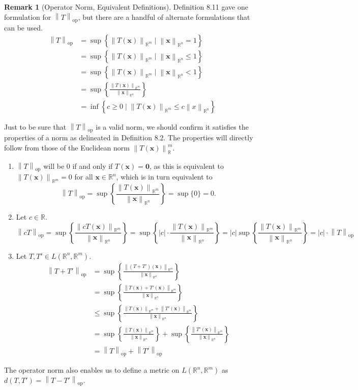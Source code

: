 \documentclass{article}
\newcommand{\R}{\mathbb{R}}
\newcommand{\x}{\mathbf{x}}
\newcommand{\ze}{\mathbf{0}}
\newcommand{\norm}[1]{\left\lVert#1\right\rVert}
\newcommand{\normop}[1]{\left\lVert#1\right\rVert_\text{op}}
\theoremstyle{definition}
\newtheorem{remark}{Remark}[section]
\begin{document}
	\begin{remark}[Operator Norm, Equivalent Definitions]
		Definition 8.11 gave one formulation for $ \norm{T}_\text{op} $, but there are a handful of alternate formulations that can be used. 
		\begin{align*}
			\norm{T}_\text{op} &  = \sup\left\{\norm{T(\x)}_{\R^m}\mid \norm{\x}_{\R^n} = 1\right\} \\
			&  =  \sup\left\{\norm{T(\x)}_{\R^m}\mid \norm{\x}_{\R^n} \le 1\right\} \\
			&  =  \sup\left\{\norm{T(\x)}_{\R^m}\mid \norm{\x}_{\R^n} < 1\right\} \\ 
			&  =  \sup\left\{\frac{\norm{T(\x)}_{\R^m}}{\norm{\x}_{\R^n}}\right\} \\
			& =\inf\left\{c\ge 0\mid \norm{T(\x)}_{\R^m} \le c\norm{x}_{\R^n}\right\}
		\end{align*}
	\end{remark}
	
	Just to be sure that $ \normop{T} $ is a valid norm, we should confirm it satisfies the properties of a norm as delineated in Definition 8.2. The properties will directly follow from those of the Euclidean norm $ \norm{T(\x)}_\R^m $. 
	\begin{enumerate}
		\item $ \normop{T} $ will be $ 0 $ if and only if $ T(\x)=\ze $, as this is equivalent to $ \norm{T(\x)}_{\R^m} = 0 $ for all $ \x\in\R^n $, which is in turn equivalent to  
		$$ \normop{T} = \sup\left\{\frac{\norm{T(\x)}_{\R^m}}{\norm{\x}_{\R^n}}\right\} = \sup\{0\} = 0.$$
		\item Let $ c\in \R $. 
		$$ \normop{cT} =\sup\left\{\frac{\norm{cT(\x)}_{\R^m}}{\norm{\x}_{\R^n}}\right\} = \sup \left\{|c|\cdot\frac{\norm{T(\x)}_{\R^m}}{\norm{\x}_{\R^n}}\right\} = |c| \sup\left\{\frac{\norm{T(\x)}_{\R^m}}{\norm{\x}_{\R^n}}\right\} =  |c|\cdot \normop{T}$$
		\item Let $ T,T'\in L(\R^n,\R^m) $.
		\begin{align*}
			\normop{T + T'} &= \sup\left\{\frac{\norm{(T + T')(\x)}_{\R^m}}{\norm{\x}_{\R^n}}\right\} \\
			& =  \sup\left\{\frac{\norm{T(\x) + T'(\x)}_{\R^m}}{\norm{\x}_{\R^n}}\right\} \\ 
			& \le  \sup\left\{\frac{\norm{T(\x)}_{\R^m} + \norm{T'(\x)}_{\R^m} }{\norm{\x}_{\R^n}}\right\} \\ 
			& =\sup\left\{\frac{\norm{T(\x)}_{\R^m}}{\norm{\x}_{\R^n}}\right\}  +  \sup\left\{\frac{\norm{T'(\x)}_{\R^m}}{\norm{\x}_{\R^n}}\right\} \\ 
			& = \normop{T }+ \normop{T'}
		\end{align*}
	\end{enumerate}
	The operator norm also enables us to define a metric on $ L(\R^n,\R^m) $ as $ d(T,T') = \normop{T-T'} $.
	
\end{document}
